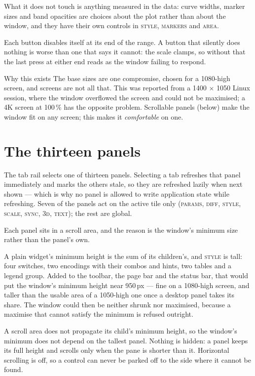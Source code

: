 \documentclass[11pt,a4paper,oneside]{report}
\newcommand{\tab}[1]{\textsc{#1}}
\begin{document}
What it does not touch is anything measured in the data: curve widths, marker
sizes and band opacities are choices about the plot rather than about the
window, and they have their own controls in \tab{style}, \tab{markers} and
\tab{area}.

Each button disables itself at its end of the range. A button that silently
does nothing is worse than one that says it cannot: the scale clamps, so
without that the last press at either end reads as the window failing to
respond.

\begin{aoenote}{Why this exists}
The base sizes are one compromise, chosen for a 1080-high screen, and screens
are not all that. This was reported from a 1400 $\times$ 1050 Linux session,
where the window overflowed the screen and could not be maximised; a 4K screen
at 100\,\% has the opposite problem. Scrollable panels (below) make the window
fit on any screen; this makes it \emph{comfortable} on one.
\end{aoenote}

\chapter{The thirteen panels}

The tab rail selects one of thirteen panels. Selecting a tab refreshes that panel
immediately and marks the others stale, so they are refreshed lazily when next
shown --- which is why no panel is allowed to write application state while
refreshing. Seven of the panels act on the active tile only (\tab{params},
\tab{diff}, \tab{style}, \tab{scale}, \tab{sync}, \tab{3d}, \tab{text}); the
rest are global.

Each panel sits in a scroll area, and the reason is the window's minimum size
rather than the panel's own.

A plain widget's minimum height is the sum of its children's, and \tab{style} is
tall: four switches, two encodings with their combos and hints, two tables and a
legend group. Added to the toolbar, the page bar and the status bar, that would
put the window's minimum height near 950\,px --- fine on a 1080-high screen, and
taller than the usable area of a 1050-high one once a desktop panel takes its
share. The window could then be neither shrunk nor maximised, because a maximise
that cannot satisfy the minimum is refused outright.

A scroll area does not propagate its child's minimum height, so the window's
minimum does not depend on the tallest panel. Nothing is hidden: a panel keeps
its full height and scrolls only when the pane is shorter than it. Horizontal
scrolling is off, so a control can never be parked off to the side where it
cannot be found.
\end{document}
